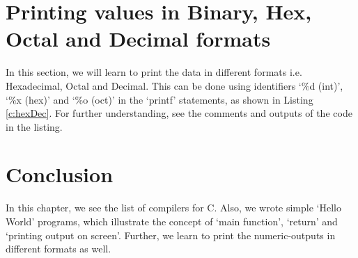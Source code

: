 
  

\section{Printing values in Binary, Hex, Octal and Decimal formats}
In this section, we will learn to print the data in different formats i.e. Hexadecimal, Octal and Decimal. This can be done using identifiers `\%d (int)', `\%x (hex)' and `\%o (oct)' in the `printf' statements, as shown in Listing \ref{c:hexDec}. For further understanding,  see the comments and outputs of the code in the listing. 




\section{Conclusion}
In this chapter, we see the list of compilers for C. Also, we wrote simple `Hello World' programs, which illustrate the concept of `main function', `return' and `printing output on screen'. Further, we learn to print the numeric-outputs in different formats as well. 

